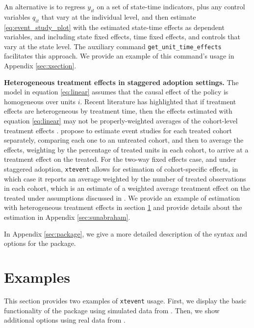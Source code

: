 \documentclass[12pt]{article}
\begin{document}
An alternative \citep{amemiya1978note, hansen2007generalized} is to regress $y_{it}$ on a set of state-time indicators, plus any control variables $q_{it}$ that vary at the individual level, and then estimate \eqref{eq:event_study_plot} with the estimated state-time effects as dependent variables, and including state fixed effects, time fixed effects, and controls that vary at the state level.
The auxiliary command \texttt{get\_unit\_time\_effects} facilitates this approach.
We provide an example of this command's usage in Appendix \ref{sec:xsection}.

\textbf{Heterogeneous treatment effects in staggered adoption settings.} The model in equation \eqref{eq:linear} assumes that the causal effect of the policy is homogeneous over units $i$.
Recent literature has highlighted that if treatment effects are heterogeneous by treatment time, then the effects estimated with equation \eqref{eq:linear} may not be properly-weighted averages of the cohort-level treatment effects \citep{athey2022design,callaway2021difference,goodman2021difference,sun2021estimating}.
\cite{sun2021estimating} propose to estimate event studies for each treated cohort separately, comparing each one to an untreated cohort, and then to average the effects, weighting by the percentage of treated units in each cohort, to arrive at a treatment effect on the treated.
For the two-way fixed effects case, and under staggered adoption, \texttt{xtevent} allows for estimation of cohort-specific effects, in which case it reports an average weighted by the number of treated observations in each cohort, which is an estimate of a weighted average treatment effect on the treated under assumptions discussed in \cite{sun2021estimating}.
We provide an example of estimation with heterogeneous treatment effects in section \ref{sec:examples} and provide details about the estimation in Appendix \ref{sec:sunabraham}.

In Appendix \ref{sec:package}, we give a more detailed description of the syntax and options for the \xtevent package.


\section{Examples}
\label{sec:examples}

This section provides two examples of \texttt{xtevent} usage.
First, we display the basic functionality of the package using simulated data from \citet{freyaldenhoven2021visualizationforth}.
Then, we show additional options using real data from \citet{martinez2022mobility}.
\end{document}
